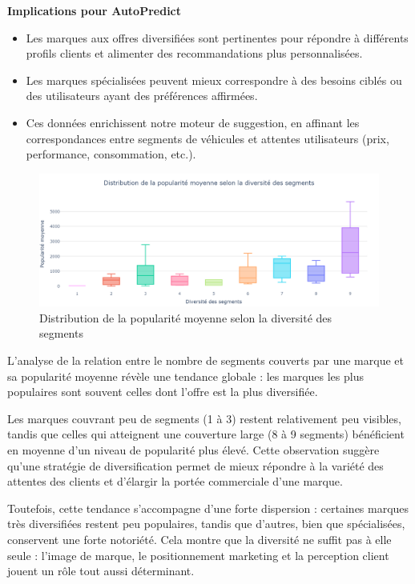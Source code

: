 \documentclass[12pt]{report}
\begin{document}
\vspace{1em}
\textbf{Implications pour AutoPredict}

\begin{itemize}
    \item Les marques aux offres diversifiées sont pertinentes pour répondre à différents profils clients et alimenter des recommandations plus personnalisées.
    \item Les marques spécialisées peuvent mieux correspondre à des besoins ciblés ou des utilisateurs ayant des préférences affirmées.
    \item Ces données enrichissent notre moteur de suggestion, en affinant les correspondances entre segments de véhicules et attentes utilisateurs (prix, performance, consommation, etc.).
\end{itemize}

\begin{figure}[H]
    \centering
    \includegraphics[width=1\textwidth]{Section_pop.png}
    \caption{Distribution de la popularité moyenne selon la diversité des segments}
    \label{fig:section-pop}
\end{figure}


L’analyse de la relation entre le nombre de segments couverts par une marque et sa popularité moyenne révèle une tendance globale : les marques les plus populaires sont souvent celles dont l’offre est la plus diversifiée.

Les marques couvrant peu de segments (1 à 3) restent relativement peu visibles, tandis que celles qui atteignent une couverture large (8 à 9 segments) bénéficient en moyenne d’un niveau de popularité plus élevé. Cette observation suggère qu’une stratégie de diversification permet de mieux répondre à la variété des attentes des clients et d’élargir la portée commerciale d’une marque.

Toutefois, cette tendance s’accompagne d’une forte dispersion : certaines marques très diversifiées restent peu populaires, tandis que d’autres, bien que spécialisées, conservent une forte notoriété. Cela montre que la diversité ne suffit pas à elle seule : l’image de marque, le positionnement marketing et la perception client jouent un rôle tout aussi déterminant.
\end{document}
